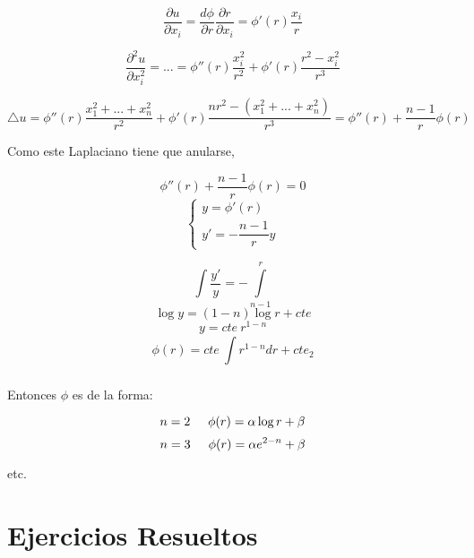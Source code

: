 \documentclass[openany]{book}
\begin{document}
$$ \dfrac{\partial u}{\partial x_i} = \dfrac{d\phi}{\partial r} \dfrac{\partial r}{\partial x_i} = \phi'(r)\dfrac{x_i}{r} $$

$$ \dfrac{\partial ^2u}{\partial x_i^2} = ... = \phi''(r) \dfrac{x_i^2}{r^2}+\phi'(r) \dfrac{r^2-x_i^2}{r^3} $$

$$ \bigtriangleup u = \phi''(r) \dfrac{x_1^2+...+x_n^2}{r^2} +\phi'(r) \dfrac{nr^2-(x_1^2+...+x_n^2)}{r^3} = \phi''(r) + \dfrac{n-1}{r}\phi(r) $$

Como este Laplaciano tiene que anularse,

$$ \phi''(r) + \dfrac{n-1}{r}\phi(r) = 0 $$
$$ \left\{
\begin{array}{l}
  y = \phi'(r)\\ 
  y' = -\dfrac{n-1}{r}y
\end{array}
\right. $$

$$ \int\limits_{}^{}\dfrac{y'}{y} = - \int\limits_{n-1}^{r} $$
$$ \log{y} = (1-n)\log{r}+cte $$
$$ y = cte\ r^{1-n} $$
$$ \phi(r) = cte\ \int\limits_{}^{}r^{1-n}dr + cte_{2} $$

Entonces $ \phi $ es de la forma:

$$ n= 2 \hspace{5mm} \phi(r) = \alpha \log{r}+\beta  $$
$$ n= 3 \hspace{5mm} \phi(r) = \alpha e^{2-n}+\beta  $$

etc.

\chapter{Ejercicios Resueltos}
\end{document}
